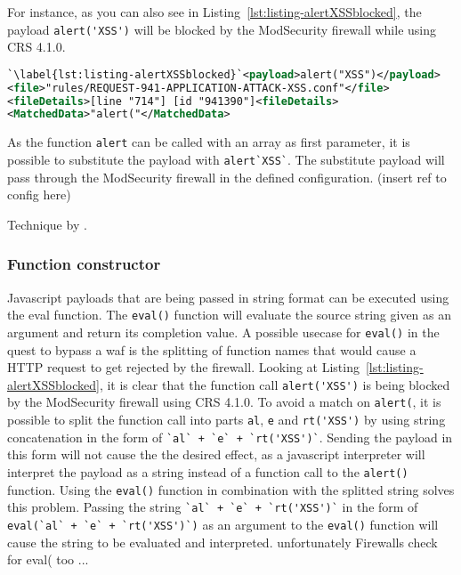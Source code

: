 For instance, as you can also see in Listing~\ref{lst:listing-alertXSSblocked}, the payload \verb|alert('XSS')| will be blocked by the ModSecurity firewall while using CRS 4.1.0.

\begin{lstlisting}[style=ruleStyle, language=XML, caption=alert("XSS") blocking example]
`\label{lst:listing-alertXSSblocked}`<payload>alert("XSS")</payload>
<file>"rules/REQUEST-941-APPLICATION-ATTACK-XSS.conf"</file>
<fileDetails>[line "714"] [id "941390"]<fileDetails>
<MatchedData>"alert("</MatchedData>
\end{lstlisting}

As the function \verb|alert| can be called with an array as first parameter, it is possible to substitute the payload with \verb|alert`XSS`|. The substitute payload will pass through the ModSecurity firewall in the defined configuration. {\color{red}(insert ref to config here)}

Technique by \cite{onecons/wafbypass}.

\subsubsection{Function constructor}
Javascript payloads that are being passed in string format can be executed using the eval function. The \verb|eval()| function will evaluate the source string given as an argument and return its completion value. \cite{js/eval}
A possible usecase for \verb|eval()| in the quest to bypass a \gls{waf} is the splitting of function names that would cause a HTTP request to get rejected by the firewall. Looking at Listing~\ref{lst:listing-alertXSSblocked}, it is clear that the function call \verb|alert('XSS')| is being blocked by the ModSecurity firewall using CRS 4.1.0. To avoid a match on \verb|alert(|, it is possible to split the function call into parts \verb|al|, \verb|e| and \verb|rt('XSS')| by using string concatenation in the form of \verb|`al` + `e` + `rt('XSS')`|. Sending the payload in this form will not cause the the desired effect, as a javascript interpreter will interpret the payload as a string instead of a function call to the \verb|alert()| function. Using the \verb|eval()| function in combination with the splitted string solves this problem. Passing the string \verb|`al` + `e` + `rt('XSS')`| in the form of \verb|eval(`al` + `e` + `rt('XSS')`)| as an argument to the \verb|eval()| function will cause the string to be evaluated and interpreted. {\color{red}unfortunately Firewalls check for eval( too ...}

\label{sec:XSS Payloads}
